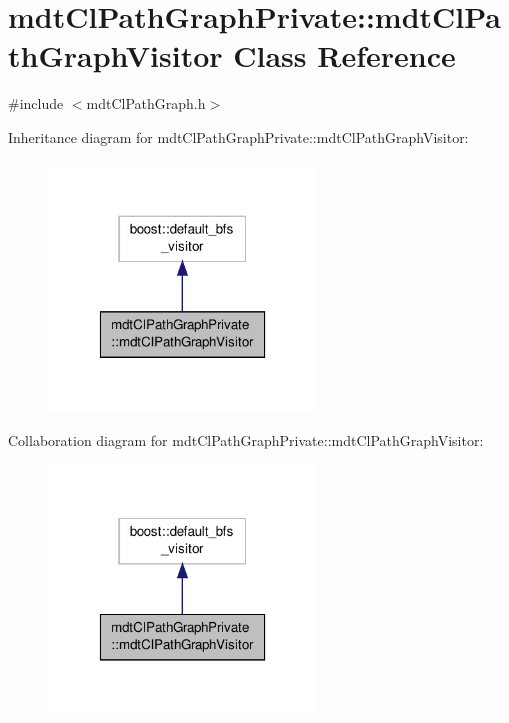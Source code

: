 \hypertarget{classmdt_cl_path_graph_private_1_1mdt_cl_path_graph_visitor}{\section{mdt\-Cl\-Path\-Graph\-Private\-:\-:mdt\-Cl\-Path\-Graph\-Visitor Class Reference}
\label{classmdt_cl_path_graph_private_1_1mdt_cl_path_graph_visitor}
}


{\ttfamily \#include $<$mdt\-Cl\-Path\-Graph.\-h$>$}



Inheritance diagram for mdt\-Cl\-Path\-Graph\-Private\-:\-:mdt\-Cl\-Path\-Graph\-Visitor\-:
\nopagebreak
\begin{figure}[H]
\begin{center}
\leavevmode
\includegraphics[width=202pt]{classmdt_cl_path_graph_private_1_1mdt_cl_path_graph_visitor__inherit__graph}
\end{center}
\end{figure}


Collaboration diagram for mdt\-Cl\-Path\-Graph\-Private\-:\-:mdt\-Cl\-Path\-Graph\-Visitor\-:
\nopagebreak
\begin{figure}[H]
\begin{center}
\leavevmode
\includegraphics[width=202pt]{classmdt_cl_path_graph_private_1_1mdt_cl_path_graph_visitor__coll__graph}
\end{center}
\end{figure}
